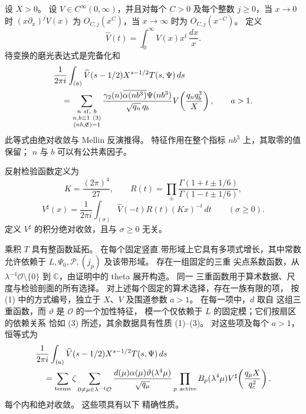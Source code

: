 设 $X>0$。 设 $V\in C^\infty(0,\infty)$，并且对每个
$C>0$ 及每个整数 $j\ge0$，当
$x\to0$ 时 $(x\partial_x)^jV(x)$ 为 $O_{C,j}(x^C)$，当 $x\to\infty$ 时为 $O_{C,j}(x^{-C})$。 定义
\[
 \widehat V(t)=\int_0^\infty V(x)x^t\,\frac{dx}{x}.
\]
待变换的磨光表达式是完备化和
\[
 \begin{split}
 &\frac1{2\pi i}\int_{(a)}\widehat V(s-1/2)X^{s-1/2}T(s,\Psi)\,ds\\
 &\quad=\sum_{\substack{n\ {\rm sf},\ b\\n,b\equiv1\ (3)\\(nb,\mathfrak E)=1}}
 \frac{\gamma_2(n)\overline{\alpha(nb^3)}\Psi(nb^3)}
      {\sqrt{q_n}\,q_b}
 V\!\left(\frac{q_nq_b^3}{X}\right),\qquad a>1.
 \end{split}
\]
此等式由绝对收敛与 Mellin 反演推得。
特征作用在整个指标 $nb^3$ 上，其取零的值保留；
$n$ 与 $b$ 可以有公共素因子。

反射检验函数定义为
\[
 K=\frac{(2\pi)^4}{27},\qquad
 R(t)=\prod_{\pm}\frac{\Gamma(1+t\pm1/6)}{\Gamma(1-t\pm1/6)},
\]
\[
 V^\sharp(x)=\frac1{2\pi i}\int_{(\sigma)}
       \widehat V(-t)R(t)(Kx)^{-t}\,dt\qquad(\sigma\ge0).
\]
定义 $V^\sharp$ 的积分绝对收敛，且与 $\sigma\ge0$ 无关。

乘积 $T$ 具有整函数延拓。 在每个固定竖直
带形域上它具有多项式增长，其中常数允许依赖于
$L,\Psi_0,\mathcal P,(j_p)$ 及该带形域。 存在一组固定的三重
尖点系数函数，从 $\lambda^{-4}\mathcal O\setminus\{0\}$ 到
$\mathbb C$，由证明中的 theta 展开构造。 同一
三重函数用于算术数据、尺度与检验剖面的所有选择。
对上述每个固定的算术选择，存在一族有限的项，
按 (1) 中的方式编号，独立于
$X$、$V$ 及围道参数 $a>1$。 在每一项中，$d$ 取自
这组三重函数，而 $\vartheta$ 是 $\mathcal O$ 的一个加性特征，
模一个仅依赖于 $L$ 的固定模；它们按扇区的依赖关系
恰如 (3) 所述，其余数据具有性质 (1)--(3)。
对这些项及每个 $a>1$，恒等式为
\begin{equation}\label{eq:reflection}
 \begin{aligned}
 &\frac1{2\pi i}\int_{(a)}\widehat V(s-1/2)X^{s-1/2}T(s,\Psi)\,ds\\
 &\quad=\sum_{\text{terms}}\zeta
 \sum_{0\ne\mu\in\lambda^{-4}\mathcal O}
 \frac{d(\mu)\alpha(\mu)\vartheta(\lambda^4\mu)}{\sqrt{q_\mu}}
 \prod_{p\ {\rm active}}B_p(\lambda^4\mu)
 V^\sharp\!\left(\frac{q_\mu X}{q_c^2}\right).
 \end{aligned}
\end{equation}
每个内和绝对收敛。 这些项具有以下
精确性质。

